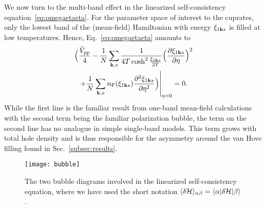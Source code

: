 \documentclass[prb, twocolumn,showpacs,preprintnumbers,amsmath,amssymb, floatfix]{revtex4}
\begin{document}
We now turn to the multi-band effect in  
the linearized self-consistency equation~\eqref{eq:omegaetaeta}.
For the parameter space of interest to the cuprates,
only the lowest band of the (mean-field) Hamiltonian
with energy $\xi_{1{\bf k} s}$ is filled
at low temperatures. Hence, Eq.~\eqref{eq:omegaetaeta} amounts to
\begin{multline}
  \Big(\frac{\tilde{V}_{pp}}{4} - \frac{1}{N}\sum_{{\bf k}, s}\frac{1}{4T\cosh^2\frac{\xi_{1{\bf k} s}}{2T}}\Big(\frac{\partial\xi_{1 {\bf k} s}}{\partial \eta}\Big)^2\\
  \left. + \frac{1}{N}\sum_{{\bf k}, s} n_{\rm F}(\xi_{1{\bf k} s})\frac{\partial^2\xi_{1 {\bf k} s}}{\partial \eta^2}\Big)\right|_{\eta=0} = 0.
  \label{eq:linself}
\end{multline}
While the first line is the familiar result from one-band mean-field calculations with the second term being the familiar polarization bubble, the term on the second line has no analogue in simple single-band models. This term grows with total hole density and is thus responsible for the asymmetry around the van Hove filling found in Sec.~\ref{subsec:results}.
\begin{figure}[tb]
  \centering
  \texttt{[image: bubble]}
  \caption{The two bubble diagrams involved in the linearized self-consistency equation, where we have used the short notation $\langle \delta\mathcal{H}\rangle_{\alpha\beta} = \langle \alpha|\delta\mathcal{H}|\beta\rangle$.}
  \label{fig:bubbles}
\end{figure}
\end{document}
